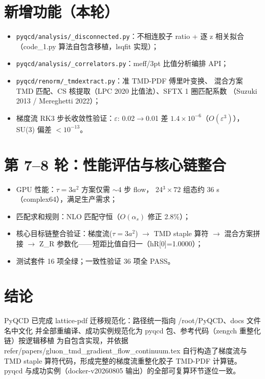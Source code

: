 \documentclass[12pt,a4paper]{ctexart}
\begin{document}
\section{新增功能（本轮）}

\begin{itemize}
  \item \texttt{pyqcd/analysis/\_disconnected.py}：不相连胶子 ratio + 逐 z 相关拟合
        （code\_1.py 算法自包含移植，lsqfit 实现）；
  \item \texttt{pyqcd/analysis/\_correlators.py}：meff/3pt 比值分析编排 API；
  \item \texttt{pyqcd/renorm/\_tmdextract.py}：准 TMD-PDF 傅里叶变换、
        混合方案 TMD 匹配、CS 核提取（LPC 2020 比值法）、SFTX 1 圈匹配系数
        （Suzuki 2013 / Mereghetti 2022）；
  \item 梯度流 RK3 步长收敛性验证：$\varepsilon$: 0.02$\rightarrow$0.01 差
        $1.4\times10^{-6}$（$O(\varepsilon^3)$），SU(3) 偏差 $<10^{-13}$。
\end{itemize}

\section{第 7--8 轮：性能评估与核心链整合}

\begin{itemize}
  \item GPU 性能：$\tau = 3a^2$ 方案仅需 $\sim 4$ 步 flow，
        24$^3\times72$ 组态约 36 s（complex64），满足生产需求；
  \item 匹配求和规则：NLO 匹配守恒（$O(\alpha_s)$ 修正 2.8\%）；
  \item 核心目标链整合验证：梯度流($\tau{=}3a^2$) $\to$ TMD staple 算符
        $\to$ 混合方案拼接 $\to$ Z\_R 参数化——短距比值自归一（hR[0]=1.0000）；
  \item 测试套件 16 项全绿；一致性验证 36 项全 PASS。
\end{itemize}

\section{结论}

PyQCD 已完成 lattice-pdf 迁移规范化：路径统一指向 /root/PyQCD、docs 文件名中文化
并全部重编译、成功实例规范化为 pyqcd 包、参考代码（zengch 重整化链）按逻辑移植
为自包含实现，并依据 refer/papers/gluon\_tmd\_gradient\_flow\_continuum.tex
自行构造了梯度流与 TMD staple 算符代码，形成完整的梯度流重整化胶子 TMD-PDF 计算链。
pyqcd 与成功实例（docker-v20260805 输出）的全部可复算环节逐位一致。
\end{document}
